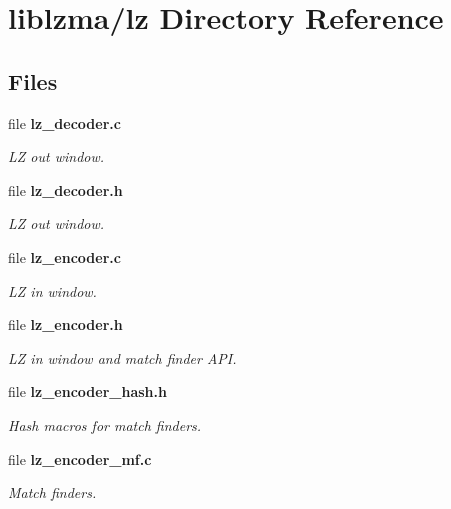 \section{liblzma/lz Directory Reference}
\label{dir_50b86e5c919915733207984a4aa1052b}
\subsection*{Files}
\begin{DoxyCompactItemize}
\item 
file \textbf{ lz\+\_\+decoder.\+c}
\begin{DoxyCompactList}\small\item\em LZ out window. \end{DoxyCompactList}\item 
file \textbf{ lz\+\_\+decoder.\+h}
\begin{DoxyCompactList}\small\item\em LZ out window. \end{DoxyCompactList}\item 
file \textbf{ lz\+\_\+encoder.\+c}
\begin{DoxyCompactList}\small\item\em LZ in window. \end{DoxyCompactList}\item 
file \textbf{ lz\+\_\+encoder.\+h}
\begin{DoxyCompactList}\small\item\em LZ in window and match finder A\+PI. \end{DoxyCompactList}\item 
file \textbf{ lz\+\_\+encoder\+\_\+hash.\+h}
\begin{DoxyCompactList}\small\item\em Hash macros for match finders. \end{DoxyCompactList}\item 
file \textbf{ lz\+\_\+encoder\+\_\+mf.\+c}
\begin{DoxyCompactList}\small\item\em Match finders. \end{DoxyCompactList}\end{DoxyCompactItemize}
